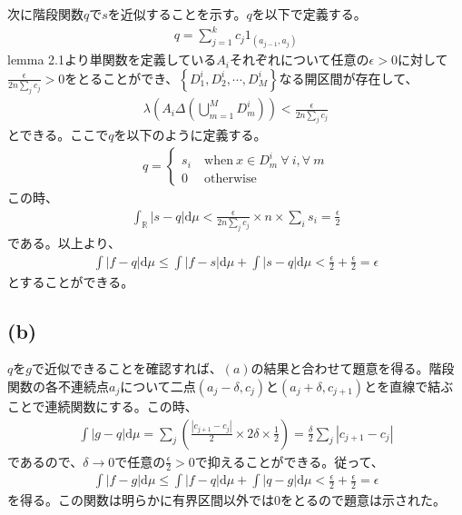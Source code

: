 \documentclass{article}
\begin{document}
次に階段関数$q$で$s$を近似することを示す。$q$を以下で定義する。
\begin{align*}
	q = \sum_{j = 1}^k c_j 1_{(a_{j-1}, a_j)}
\end{align*}
lemma 2.1より単関数を定義している$A_i$それぞれについて任意の$\epsilon > 0$に対して$\frac{\epsilon}{2n\sum_j c_j} > 0$をとることができ、$\left\{ D_1^i, D_2^i, \cdots, D_M^i \right\}$なる開区間が存在して、
\begin{align*}
	\lambda\left( A_i \Delta \left( \bigcup_{m = 1}^M D_m^i \right) \right) < \frac{\epsilon}{2n\sum_j c_j} 
\end{align*}
とできる。ここで$q$を以下のように定義する。
\begin{align*}
	q = \begin{cases}
	s_i \ &\text{when}\ x \in D_m^i\ \forall\ i,\forall\ m\\
	0\ &\text{otherwise}
	\end{cases}
\end{align*}
この時、
\begin{align*}
	\int_{\mathbb{R}} \left| s - q \right| \mathrm{d}\mu < \frac{\epsilon}{2n\sum_j c_j} \times n \times \sum_i s_i = \frac{\epsilon}{2}
\end{align*}
である。以上より、
\begin{align*}
	\int |f-q|\mathrm{d}\mu \leq \int |f-s| \mathrm{d}\mu + \int |s-q | \mathrm{d}\mu < \frac{\epsilon}{2} + \frac{\epsilon}{2} = \epsilon
\end{align*}
とすることができる。

\subsection{(b)}
$q$を$g$で近似できることを確認すれば、$(a)$の結果と合わせて題意を得る。階段関数の各不連続点$a_j$について二点$(a_j-\delta, c_j)$と$(a_j + \delta, c_{j+1})$とを直線で結ぶことで連続関数にする。この時、
\begin{align*}
	\int |g -q|\mathrm{d}\mu = \sum_j \left( \frac{|c_{j+1} - c_j|}{2} \times 2\delta \times \frac{1}{2} \right) = \frac{\delta}{2} \sum_j | c_{j+1} - c_j |
\end{align*}
であるので、$\delta \to 0$で任意の$\frac{\epsilon}{2} > 0$で抑えることができる。従って、
\begin{align*}
	\int |f-g|\mathrm{d}\mu \leq \int |f-q| \mathrm{d}\mu + \int |q-g | \mathrm{d}\mu < \frac{\epsilon}{2} + \frac{\epsilon}{2} = \epsilon
\end{align*}
を得る。この関数は明らかに有界区間以外では$0$をとるので題意は示された。
\end{document}
